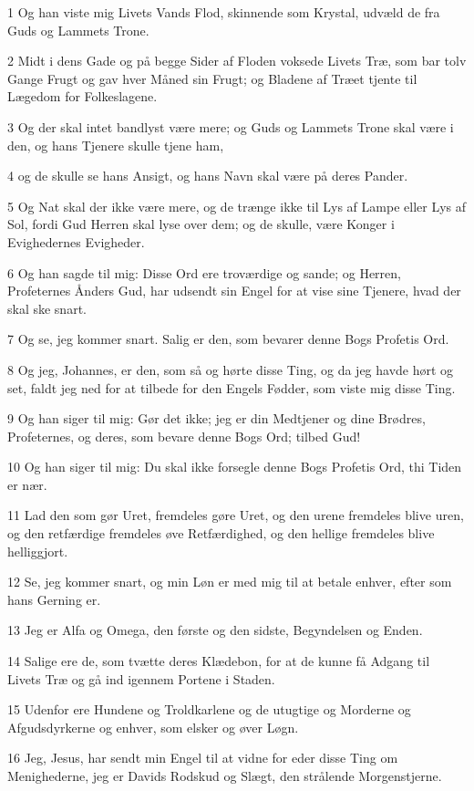 \par 1 Og han viste mig Livets Vands Flod, skinnende som Krystal, udvæld de fra Guds og Lammets Trone.
\par 2 Midt i dens Gade og på begge Sider af Floden voksede Livets Træ, som bar tolv Gange Frugt og gav hver Måned sin Frugt; og Bladene af Træet tjente til Lægedom for Folkeslagene.
\par 3 Og der skal intet bandlyst være mere; og Guds og Lammets Trone skal være i den, og hans Tjenere skulle tjene ham,
\par 4 og de skulle se hans Ansigt, og hans Navn skal være på deres Pander.
\par 5 Og Nat skal der ikke være mere, og de trænge ikke til Lys af Lampe eller Lys af Sol, fordi Gud Herren skal lyse over dem; og de skulle, være Konger i Evighedernes Evigheder.
\par 6 Og han sagde til mig: Disse Ord ere troværdige og sande; og Herren, Profeternes Ånders Gud, har udsendt sin Engel for at vise sine Tjenere, hvad der skal ske snart.
\par 7 Og se, jeg kommer snart. Salig er den, som bevarer denne Bogs Profetis Ord.
\par 8 Og jeg, Johannes, er den, som så og hørte disse Ting, og da jeg havde hørt og set, faldt jeg ned for at tilbede for den Engels Fødder, som viste mig disse Ting.
\par 9 Og han siger til mig: Gør det ikke; jeg er din Medtjener og dine Brødres, Profeternes, og deres, som bevare denne Bogs Ord; tilbed Gud!
\par 10 Og han siger til mig: Du skal ikke forsegle denne Bogs Profetis Ord, thi Tiden er nær.
\par 11 Lad den som gør Uret, fremdeles gøre Uret, og den urene fremdeles blive uren, og den retfærdige fremdeles øve Retfærdighed, og den hellige fremdeles blive helliggjort.
\par 12 Se, jeg kommer snart, og min Løn er med mig til at betale enhver, efter som hans Gerning er.
\par 13 Jeg er Alfa og Omega, den første og den sidste, Begyndelsen og Enden.
\par 14 Salige ere de, som tvætte deres Klædebon, for at de kunne få Adgang til Livets Træ og gå ind igennem Portene i Staden.
\par 15 Udenfor ere Hundene og Troldkarlene og de utugtige og Morderne og Afgudsdyrkerne og enhver, som elsker og øver Løgn.
\par 16 Jeg, Jesus, har sendt min Engel til at vidne for eder disse Ting om Menighederne, jeg er Davids Rodskud og Slægt, den strålende Morgenstjerne.
